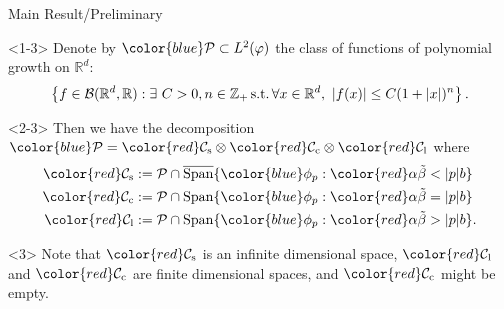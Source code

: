 \documentclass[xcolor=dvipsnames]{beamer}
\begin{document}
\begin{frame}{Main Result/Preliminary}
\begin{block}{}<1-3>
	Denote by $\color{blue}\mathcal P \subset L^2(\varphi)$ the class of functions of polynomial growth on $\mathbb R^d$:
	$$
	\left\{f\in \mathcal B(\mathbb R^d, \mathbb R):\exists~ C>0, n \in \mathbb Z_+ {\rm\,  s. t. \, } \forall x\in \mathbb R^d,~ |f(x)|\leq C(1+|x|)^n\right\}.
	$$
\end{block}
\begin{block}{}<2-3>
	Then we have the decomposition ${\color{blue}\mathcal P} = {\color{red}\mathcal C_\mathrm s} \otimes {\color{red}\mathcal C_\mathrm c} \otimes {\color{red}\mathcal C_\mathrm l}$ where
\begin{align*}
	{\color{red}\mathcal C_\mathrm s} &:= \mathcal P \cap \overline{\operatorname{Span}} \{ {\color{blue}\phi_p}: {\color{red}\alpha \tilde \beta < |p| b} \}\\
 	{\color{red}\mathcal C_\mathrm c}   &:= \mathcal P \cap \operatorname{Span} \{ {\color{blue}\phi_p} : {\color{red}\alpha \tilde \beta = |p| b} \} \\
	{\color{red}\mathcal C_\mathrm l} &  := \mathcal P \cap \operatorname{Span} \{ {\color{blue}\phi_p}: {\color{red}\alpha \tilde \beta > |p| b} \}.
\end{align*}
\end{block}

\begin{block}{}<3>
Note that $\color{red}\mathcal C_\mathrm s$ is an infinite dimensional space, ${\color{red}\mathcal C_\mathrm l}$ and ${\color{red}\mathcal C_\mathrm c}$
are finite dimensional spaces, and ${\color{red}\mathcal C_\mathrm c}$ might be empty.
\end{block}
\end{frame}
\end{document}
